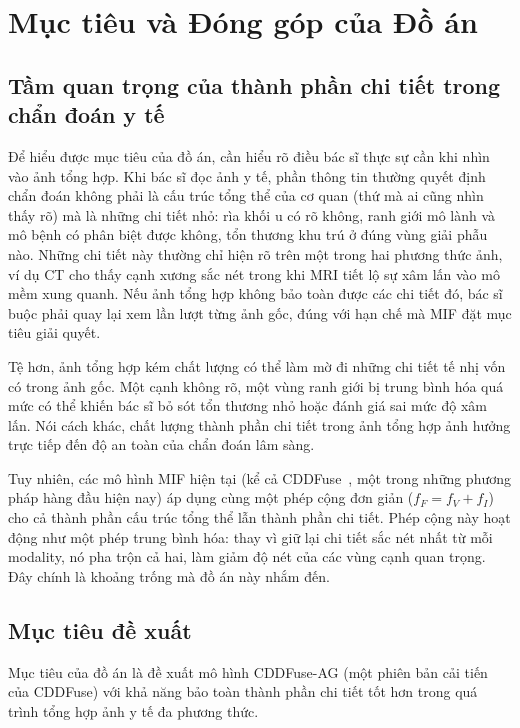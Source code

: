 \section{Mục tiêu và Đóng góp của Đồ án}
\label{sec:goal}

\subsection{Tầm quan trọng của thành phần chi tiết trong chẩn đoán y tế}
\label{ssec:goal-motivation}

Để hiểu được mục tiêu của đồ án, cần hiểu rõ điều bác sĩ thực sự cần khi nhìn vào ảnh tổng hợp. Khi bác sĩ đọc ảnh y tế, phần thông tin thường quyết định chẩn đoán không phải là cấu trúc tổng thể của cơ quan (thứ mà ai cũng nhìn thấy rõ) mà là những chi tiết nhỏ: rìa khối u có rõ không, ranh giới mô lành và mô bệnh có phân biệt được không, tổn thương khu trú ở đúng vùng giải phẫu nào. Những chi tiết này thường chỉ hiện rõ trên một trong hai phương thức ảnh, ví dụ CT cho thấy cạnh xương sắc nét trong khi MRI tiết lộ sự xâm lấn vào mô mềm xung quanh. Nếu ảnh tổng hợp không bảo toàn được các chi tiết đó, bác sĩ buộc phải quay lại xem lần lượt từng ảnh gốc, đúng với hạn chế mà MIF đặt mục tiêu giải quyết.

Tệ hơn, ảnh tổng hợp kém chất lượng có thể làm mờ đi những chi tiết tế nhị vốn có trong ảnh gốc. Một cạnh không rõ, một vùng ranh giới bị trung bình hóa quá mức có thể khiến bác sĩ bỏ sót tổn thương nhỏ hoặc đánh giá sai mức độ xâm lấn. Nói cách khác, chất lượng thành phần chi tiết trong ảnh tổng hợp ảnh hưởng trực tiếp đến độ an toàn của chẩn đoán lâm sàng.

Tuy nhiên, các mô hình MIF hiện tại (kể cả CDDFuse~\cite{zhao2023cddfuse}, một trong những phương pháp hàng đầu hiện nay) áp dụng cùng một phép cộng đơn giản ($f_F = f_V + f_I$) cho cả thành phần cấu trúc tổng thể lẫn thành phần chi tiết. Phép cộng này hoạt động như một phép trung bình hóa: thay vì giữ lại chi tiết sắc nét nhất từ mỗi modality, nó pha trộn cả hai, làm giảm độ nét của các vùng cạnh quan trọng. Đây chính là khoảng trống mà đồ án này nhắm đến.

\subsection{Mục tiêu đề xuất}
\label{ssec:goal-objective}

Mục tiêu của đồ án là đề xuất mô hình CDDFuse-AG (một phiên bản cải tiến của CDDFuse) với khả năng bảo toàn thành phần chi tiết tốt hơn trong quá trình tổng hợp ảnh y tế đa phương thức.


